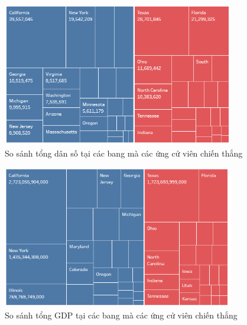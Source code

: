 \documentclass[10pt]{beamer}
\theoremstyle{remark}
\theoremstyle{definition}
\begin{document}
\begin{frame}
    \begin{figure}[h!]
        \centering
        \includegraphics[width=0.9\textwidth]{figures/State_Population_Treemap.png}
        \caption{So sánh tổng dân số tại các bang mà các ứng cử viên chiến thắng}
    \end{figure}
\end{frame}

\begin{frame}
    \begin{figure}[h!]
        \centering
        \includegraphics[width=0.9\textwidth]{figures/State_GDP_Treemap.png}
        \caption{So sánh tổng GDP tại các bang mà các ứng cử viên chiến thắng}
    \end{figure}
\end{frame}
\end{document}
